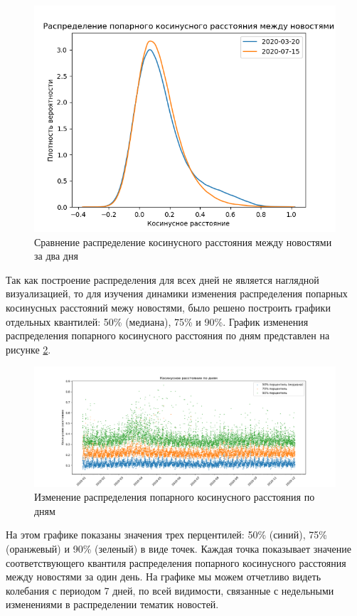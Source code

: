 \begin{figure}[h]
    \centering
    \includegraphics[width=\linewidth]{images/distances-distribution.png}
    \caption{Сравнение распределение косинусного расстояния между новостями за два дня}
    \label{img:distances-distribution}
\end{figure}

Так как построение распределения для всех дней не является наглядной визуализацией, то для изучения динамики изменения распределения попарных косинусных расстояний межу новостями, было решено построить графики отдельных квантилей: 50\% (медиана), 75\% и 90\%. График изменения распределения попарного косинусного расстояния по дням представлен на рисунке \ref{img:distances}.

\begin{figure}[h]
    \centering
    \includegraphics[width=\linewidth]{images/distances.png}
    \caption{Изменение распределения попарного косинусного расстояния по дням}
    \label{img:distances}
\end{figure}

На этом графике показаны значения трех перцентилей: 50\% (синий), 75\% (оранжевый) и 90\% (зеленый) в виде точек. Каждая точка показывает значение соответствующего квантиля распределения попарного косинусного расстояния между новостями за один день. На графике мы  можем отчетливо видеть колебания с периодом 7 дней, по всей видимости, связанные с недельными изменениями в  распределении тематик новостей.

